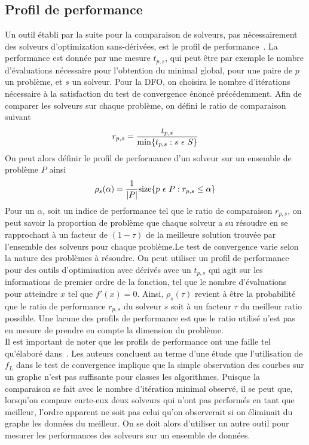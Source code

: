 	\subsection{Profil de performance}
	Un outil établi par la suite pour la comparaison de solveurs, pas nécessairement des solveurs d'optimization sans-dérivées, est le profil de performance~\cite{DoMo02}. La performance est donnée par une mesure $t_{p,s}$, qui peut être par exemple le nombre d'évaluations nécessaire pour l'obtention du minimal global, pour une paire de $p$ un problème, et $s$ un solveur. Pour la DFO, on choisira le nombre d'itérations nécessaire à la satisfaction du test de convergence énoncé précédemment. Afin de comparer les solveurs sur chaque problème, on défini le ratio de comparaison suivant
	\begin{equation*}
	r_{p,s}=\frac{t_{p,s}}{\min\{t_{p,s} : s\  \epsilon \  S\}}\\
	\end{equation*}
	On peut alors définir le profil de performance d'un solveur sur un ensemble de problème $P$ ainsi
	\begin{equation*}
	\rho_s(\alpha)=\frac{1}{|P|}\text{size}\{p\ \epsilon \ P : r_{p,s} \leq \alpha \}\\
	\end{equation*}
	Pour un $\alpha$, soit un indice de performance tel que le ratio de comparaison $r_{p,s}$, on peut savoir la proportion de problème que chaque solveur a su résoudre en se rapprochant à un facteur de $(1-\tau)$ de la meilleure solution trouvée par l'ensemble des solveurs pour chaque problème.Le test de convergence varie selon la nature des problèmes à résoudre. On peut utiliser un profil de performance pour des outils d'optimisation avec dérivés avec un $t_{p,s}$ qui agit sur les informations de premier ordre de la fonction, tel que le nombre d'évaluations pour atteindre $x$ tel que $f'(x)=0$. Ainsi, $\rho_s(\tau)$ revient à être la probabilité que le ratio de performance $r_{p,s}$ du solveur $s$ soit à un facteur $\tau$ du meilleur ratio possible. Une lacune des profils de performance est que le ratio utilisé n'est pas en mesure de prendre en compte la dimension du problème.\\
	Il est important de noter que les profils  de performance ont une faille tel qu'élaboré dans~\cite{GoSc2016}. Les auteurs concluent au terme d'une étude que l'utilisation de $f_L$ dans le test de convergence implique que la simple observation des courbes sur un graphe n'est pas suffisante pour classes les algorithmes. Puisque la comparaison se fait avec le nombre d'itération minimal observé, il se peut que, lorsqu'on compare enrte-eux deux solveurs qui n'ont pas performés en tant que meilleur, l'ordre apparent ne soit pas celui qu'on observerait si on éliminait du graphe les données du meilleur. On se doit alors d'utiliser un autre outil pour mesurer les performances des solveurs sur un ensemble de données.
